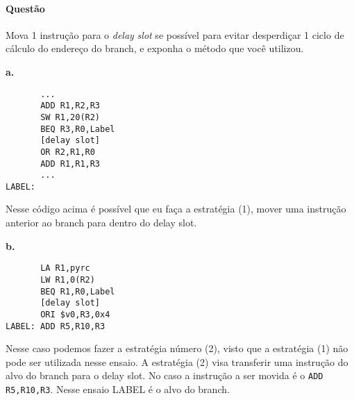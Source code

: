 \documentclass{article}
\begin{document}
\paragraph{Questão} Mova 1 instrução para o \textit{delay} \textit{slot} se 
possível para evitar desperdiçar 1 ciclo de cálculo do endereço do branch, e 
exponha o método que você utilizou.

\textbf{a.}

\begin{verbatim}
       ...
       ADD R1,R2,R3
       SW R1,20(R2)
       BEQ R3,R0,Label
       [delay slot]
       OR R2,R1,R0
       ADD R1,R1,R3
       ...
LABEL:
\end{verbatim}

Nesse código acima é possível que eu faça a estratégia (1), mover uma instrução 
anterior ao branch para dentro do delay slot.

\textbf{b.}

\begin{verbatim}
       LA R1,pyrc
       LW R1,0(R2)
       BEQ R1,R0,Label
       [delay slot]
       ORI $v0,R3,0x4
LABEL: ADD R5,R10,R3
\end{verbatim}

Nesse caso podemos fazer a estratégia número (2), visto que a estratégia (1) 
não pode ser utilizada nesse ensaio. A estratégia (2) visa transferir uma 
instrução do alvo do branch para o delay slot. No caso a instrução a ser movida 
é o \verb|ADD R5,R10,R3|. Nesse ensaio LABEL é o alvo do branch.
\end{document}

